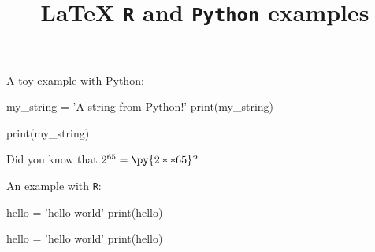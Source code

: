 \documentclass[a4paper,12pt]{article}
\begin{document}
\title{\textbf{\LaTeX{}  \texttt{R} and \texttt{Python} examples}}
\date{}

\maketitle

A toy example with Python:
\begin{pycode}
my_string = 'A string from Python!'
print(my_string)
\end{pycode}

\begin{pyblock}
print(my_string)
\end{pyblock}
\begin{quotation}
\printpythontex
\end{quotation}

Did you know that $2^{65} = \py{2**65}$?

An example with \texttt{R}:

\begin{Rcode}
hello = 'hello world'
print(hello)
\end{Rcode}

\begin{Rblock}
hello = 'hello world'
print(hello)
\end{Rblock}
\end{document}
